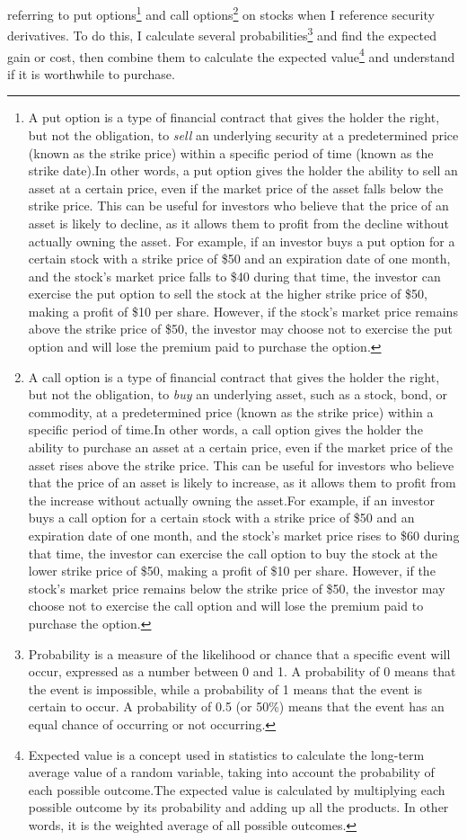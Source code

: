 \documentclass[
]{book}
\begin{document}
referring to put options\footnote{A put option is a type of financial contract that
  gives the holder the right, but not the obligation, to \emph{sell} an underlying
  security at a predetermined price (known as the strike price) within a specific
  period of time (known as the strike date).In other words, a put option
  gives the holder the ability to sell an asset at a certain price, even if the market
  price of the asset falls below the strike price. This can be useful for
  investors who believe that the price of an asset is likely to decline, as it
  allows them to profit from the decline without actually owning the asset.
  For example, if an investor buys a put option for a certain stock with a strike
  price of \$50 and an expiration date of one month, and the stock's market price
  falls to \$40 during that time, the investor can exercise the put option to sell
  the stock at the higher strike price of \$50, making a profit of \$10 per share.
  However, if the stock's market price remains above the strike price of
  \$50, the investor may choose not to exercise the put option and will lose the
  premium paid to purchase the option.} and call options\footnote{A call option is a type
  of financial contract that gives the holder the right, but not the obligation,
  to \emph{buy} an underlying asset, such as a stock, bond, or commodity, at a
  predetermined price (known as the strike price) within a specific period of
  time.In other words, a call option gives the holder the ability to
  purchase an asset at a certain price, even if the market price of the asset
  rises above the strike price. This can be useful for investors who believe that
  the price of an asset is likely to increase, as it allows them to profit from
  the increase without actually owning the asset.For example, if an
  investor buys a call option for a certain stock with a strike price of \$50 and
  an expiration date of one month, and the stock's market price rises to \$60
  during that time, the investor can exercise the call option to buy the stock at
  the lower strike price of \$50, making a profit of \$10 per share.
  However, if the stock's market price remains below the strike price of \$50, the
  investor may choose not to exercise the call option and will lose the premium
  paid to purchase the option.} on stocks when I reference security derivatives.
To do this, I
calculate several probabilities\footnote{Probability is a measure of the likelihood or
  chance that a specific event will occur, expressed as a number between 0 and 1.
  A probability of 0 means that the event is impossible, while a
  probability of 1 means that the event is certain to occur. A probability of
  0.5 (or 50\%) means that the event has an equal chance of occurring or not
  occurring.} and find the expected gain or cost, then combine them to calculate
the expected value\footnote{Expected value is a concept used in statistics
  to calculate the long-term average value of a random variable, taking into
  account the probability of each possible outcome.The expected value is
  calculated by multiplying each possible outcome by its probability and adding up
  all the products. In other words, it is the weighted average of all possible
  outcomes.} and understand if it is worthwhile to purchase.
\end{document}
